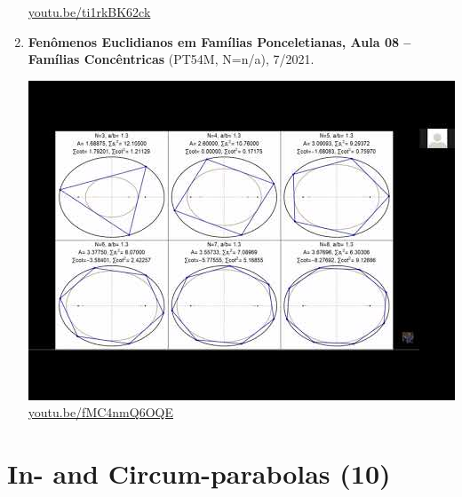 \documentclass[12pt]{amsart}
\begin{document}
\begin{enumerate}[resume]
\begin{center}
\href{https://youtu.be/ti1rkBK62ck}{\url{youtu.be/ti1rkBK62ck}}\end{center}
% 
\item \textbf{Fenômenos Euclidianos em Famílias Ponceletianas, Aula 08 -- Famílias Concêntricas} (PT54M, N=n/a), 7/2021. 
\begin{center}\includegraphics[width=.5\textwidth]{pics/fMC4nmQ6OQE.jpg} \\ 
\href{https://youtu.be/fMC4nmQ6OQE}{\url{youtu.be/fMC4nmQ6OQE}}\end{center}
% 
\end{enumerate}

\section{In- and Circum-parabolas (10)}
\end{document}
